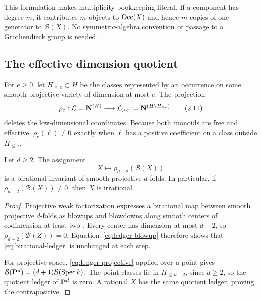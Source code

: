 This formulation makes multiplicity bookkeeping literal.  If a component has
degree $m$, it contributes $m$ objects to \(\operatorname{Occ}(X)\) and hence $m$
copies of one generator to \(\mathcal B(X)\).  No symmetric-algebra convention
or passage to a Grothendieck group is needed.

\subsection{The effective dimension quotient}

For $e\ge0$, let $H_{\le e}\subset H$ be the classes represented by an
occurrence on some smooth projective variety of dimension at most $e$.  The
projection
\[
 \rho_e:\mathcal L=\mathbf N^{(H)}\longrightarrow
 \mathcal L_{>e}:=\mathbf N^{(H\setminus H_{\le e})}
 \tag{2.11}\label{eq:dimension-quotient}
\]
deletes the low-dimensional coordinates.  Because both monoids are free and
effective, \(\rho_e(\ell)\ne0\) exactly when \(\ell\) has a positive
coefficient on a class outside $H_{\le e}$.

\begin{theorem}
\label{thm:birational-quotient}
Let $d\ge2$.  The assignment
\[
 X\longmapsto \rho_{d-2}(\mathcal B(X))
 \tag{2.12}\label{eq:birational-ledger}
\]
is a birational invariant of smooth projective $d$-folds.  In particular,
if \(\rho_{d-2}(\mathcal B(X))\ne0\), then $X$ is irrational.
\end{theorem}

\begin{proof}
Projective weak factorization expresses a birational map between smooth
projective $d$-folds as blowups and blowdowns along smooth centers of
codimension at least two \cite[Theorem~0.1.1]{AKMW}.  Every center has
dimension at most $d-2$, so \(\rho_{d-2}(\mathcal B(Z))=0\).
Equation~\eqref{eq:ledger-blowup} therefore shows that
\eqref{eq:birational-ledger} is unchanged at each step.

For projective space, \eqref{eq:ledger-projective} applied over a point gives
\(\mathcal B(\mathbf P^d)=(d+1)\mathcal B(\operatorname{Spec}k)\).  The point
classes lie in $H_{\le d-2}$, since $d\ge2$, so the quotient ledger of
\(\mathbf P^d\) is zero.  A rational $X$ has the same quotient ledger, proving the
contrapositive.
\end{proof}
